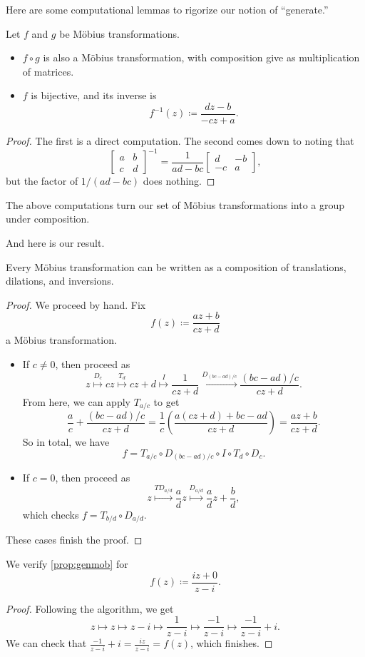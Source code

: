 \documentclass[../notes.tex]{subfiles}
\begin{document}
Here are some computational lemmas to rigorize our notion of ``generate.''
\begin{lemma} \label{lem:mobgrp}
	Let $f$ and $g$ be M\"obius transformations.
	\begin{itemize}
		\item $f\circ g$ is also a M\"obius transformation, with composition give as multiplication of matrices.
		\item $f$ is bijective, and its inverse is
		\[f^{-1}(z)\coloneqq\frac{dz-b}{-cz+a}.\]
	\end{itemize}
\end{lemma}
\begin{proof}
	The first is a direct computation. The second comes down to noting that
	\[\begin{bmatrix}
		a & b \\
		c & d
	\end{bmatrix}^{-1}=\frac1{ad-bc}\begin{bmatrix}
		d & -b \\
		-c & a
	\end{bmatrix},\]
	but the factor of $1/(ad-bc)$ does nothing.
\end{proof}
\begin{remark}
	The above computations turn our set of M\"obius transformations into a group under composition.
\end{remark}
And here is our result.
\begin{proposition} \label{prop:genmob}
	Every M\"obius transformation can be written as a composition of translations, dilations, and inversions.
\end{proposition}
\begin{proof}
	We proceed by hand. Fix
	\[f(z)\coloneqq\frac{az+b}{cz+d}\]
	a M\"obius transformation.
	\begin{itemize}
		\item If $c\ne0$, then proceed as
		\[z\stackrel{D_c}\longmapsto cz\stackrel{T_d}\longmapsto cz+d\stackrel{I}\longmapsto\frac1{cz+d}\stackrel{D_{(bc-ad)/c}}\longmapsto\frac{(bc-ad)/c}{cz+d}.\]
		From here, we can apply $T_{a/c}$ to get
		\[\frac ac+\frac{(bc-ad)/c}{cz+d}=\frac1c\left(\frac{a(cz+d)+bc-ad}{cz+d}\right)=\frac{az+b}{cz+d}.\]
		So in total, we have
		\[f=T_{a/c}\circ D_{(bc-ad)/c}\circ I\circ T_d\circ D_c.\]
		\item If $c=0$, then proceed as
		\[z\stackrel{TD_{a/d}}\longmapsto\frac adz\stackrel{D_{a/d}}\longmapsto\frac adz+\frac bd,\]
		which checks $f=T_{b/d}\circ D_{a/d}$.
	\end{itemize}
	These cases finish the proof.
\end{proof}
\begin{exe}
	We verify \autoref{prop:genmob} for
	\[f(z)\coloneqq\frac{iz+0}{z-i}.\]
\end{exe}
\begin{proof}
	Following the algorithm, we get
	\[z\longmapsto z\longmapsto z-i\longmapsto\frac1{z-i}\longmapsto\frac{-1}{z-i}\longmapsto\frac{-1}{z-i}+i.\]
	We can check that $\frac{-1}{z-i}+i=\frac{iz}{z-i}=f(z)$, which finishes.
\end{proof}
\end{document}
